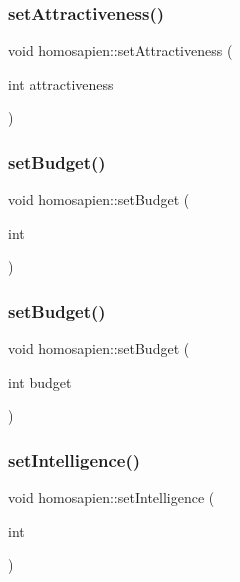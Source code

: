 \subsubsection{\texorpdfstring{set\+Attractiveness()}{setAttractiveness()}\hspace{0.1cm}{\footnotesize\ttfamily [2/2]}}
{\footnotesize\ttfamily void homosapien\+::set\+Attractiveness (\begin{DoxyParamCaption}\item[{int}]{attractiveness }\end{DoxyParamCaption})}

\mbox{\label{classhomosapien_a3ad8cc4965cf29863337d0d56ca87d2d}} 
\subsubsection{\texorpdfstring{set\+Budget()}{setBudget()}\hspace{0.1cm}{\footnotesize\ttfamily [1/2]}}
{\footnotesize\ttfamily void homosapien\+::set\+Budget (\begin{DoxyParamCaption}\item[{int}]{ }\end{DoxyParamCaption})}

\mbox{\label{classhomosapien_a3ad8cc4965cf29863337d0d56ca87d2d}} 
\subsubsection{\texorpdfstring{set\+Budget()}{setBudget()}\hspace{0.1cm}{\footnotesize\ttfamily [2/2]}}
{\footnotesize\ttfamily void homosapien\+::set\+Budget (\begin{DoxyParamCaption}\item[{int}]{budget }\end{DoxyParamCaption})}

\mbox{\label{classhomosapien_adcfb3c7207fd77965679df8b85e5a507}} 
\subsubsection{\texorpdfstring{set\+Intelligence()}{setIntelligence()}\hspace{0.1cm}{\footnotesize\ttfamily [1/2]}}
{\footnotesize\ttfamily void homosapien\+::set\+Intelligence (\begin{DoxyParamCaption}\item[{int}]{ }\end{DoxyParamCaption})}

